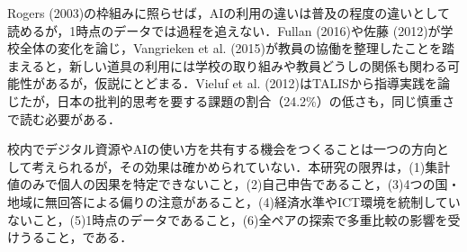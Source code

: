 \documentclass[a4paper,10pt,twocolumn]{ltjsarticle}
\begin{document}
Rogers (2003)の枠組みに照らせば，AIの利用の違いは普及の程度の違いとして読めるが，1時点のデータでは過程を追えない．Fullan (2016)や佐藤 (2012)が学校全体の変化を論じ，Vangrieken et al. (2015)が教員の協働を整理したことを踏まえると，新しい道具の利用には学校の取り組みや教員どうしの関係も関わる可能性があるが，仮説にとどまる．Vieluf et al. (2012)はTALISから指導実践を論じたが，日本の批判的思考を要する課題の割合（24.2\%）の低さも，同じ慎重さで読む必要がある．

校内でデジタル資源やAIの使い方を共有する機会をつくることは一つの方向として考えられるが，その効果は確かめられていない．本研究の限界は，(1)集計値のみで個人の因果を特定できないこと，(2)自己申告であること，(3)4つの国・地域に無回答による偏りの注意があること，(4)経済水準やICT環境を統制していないこと，(5)1時点のデータであること，(6)全ペアの探索で多重比較の影響を受けうること，である．
\end{document}
